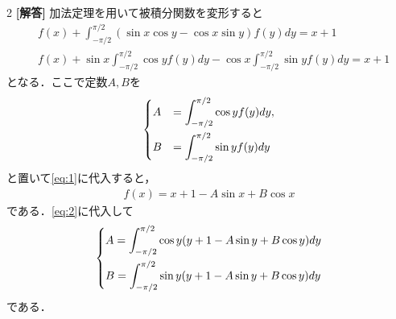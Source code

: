 \documentclass[../../main.tex]{subfiles}
\begin{document}
\setcounter{equation}{0}
\begin{oframed}
  
\end{oframed}
\setlength{\columnseprule}{0.4pt}
\begin{multicols}{2}
  {\bf [解答]}
  加法定理を用いて被積分関数を変形すると
  \begin{align}
    & f(x) + \int_{-\pi/2}^{\pi/2} (\sin x \cos y - \cos x \sin y) f(y) dy = x+1 \nonumber \\
    & f(x) + \sin x \int_{-\pi/2}^{\pi/2} \cos y f(y) dy
    - \cos x \int_{-\pi/2}^{\pi/2} \sin y f(y) dy = x+1 \label{eq:1}
  \end{align}
  となる．ここで定数$A,B$を
  \begin{align}
    \begin{dcases}
      A & = \int_{-\pi/2}^{\pi/2} \cos y f(y) dy, \\
      B & = \int_{-\pi/2}^{\pi/2} \sin y f(y) dy
    \end{dcases} \label{eq:2}
  \end{align}
  と置いて\cref{eq:1}に代入すると，
  \begin{align}
    f(x) = x+1 - A\sin x + B\cos x
  \end{align}
  である．\cref{eq:2}に代入して
  \begin{align}
    \begin{dcases}
      A = \int_{-\pi/2}^{\pi/2} \cos y (y+1-A\sin y+B\cos y) dy \\
      B = \int_{-\pi/2}^{\pi/2} \sin y (y+1-A\sin y+B\cos y) dy
    \end{dcases}\label{eq:3}
  \end{align}
  である．


\end{multicols}
\end{document}

